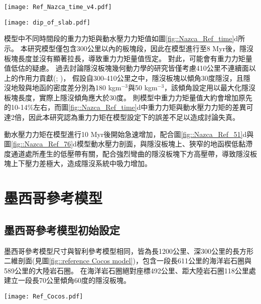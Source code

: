 \begin{figure*}[ht!]
    \centering
    \texttt{[image: Ref\_Nazca\_time\_v4.pdf]}
    \caption[智利參考模型隱沒板塊狀態隨時間變化]{智利參考模型隱沒板塊狀態隨時間變化，灰色底標出平坦隱沒發育後時間段。(a)參考模型平坦長度隨時間變化。(b)參考模型平坦深度隨時間變化，灰虛線為\citealp{Manea2017}中提及之智利平坦隱沒平坦深度約落在100公里深。(c)參考模型隱沒板塊自海溝到深度150公里之傾角，傾角值有做1 Myr的移動平均。(d)參考模型中重力力矩與動水壓力力矩隨時間變化。其中粉紅色線為重力力矩，深藍色線為動水壓力力矩。兩者皆有做1 Myr的移動平均。}
    \label{fig::Nazca_Ref_time}
\end{figure*}

\begin{figure*}[h]
    \centering
    \texttt{[image: dip\_of\_slab.pdf]}
    \caption[本研究中隱沒傾角的計算方式]{本研究中隱沒傾角的計算方式。}
    \label{fig::dip_of_slab}
\end{figure*}

模型中不同時間段的重力力矩與動水壓力力矩值如圖\ref{fig::Nazca_Ref_time}d所示。
本研究模型僅包含300公里以內的板塊段，因此在模型進行至8 Myr後，隱沒板塊長度並沒有顯著拉長，導致重力力矩量值恆定。
對此，可能會有重力力矩量值低估的疑慮。
過去討論隱沒板塊幾何動力學的研究皆僅考慮410公里不連續面以上的作用力貢獻(\citealp{schellart2004quantifying}; \citealp{billen2008modeling})，
假設自300-410公里之中，隱沒板塊以傾角30度隱沒，且隱沒地殼與地函的密度差分別為180 kgm$^{-3}$與50 kgm$^{-3}$，該傾角設定用以最大化隱沒板塊長度，實際上隱沒傾角應大於30度。
則模型中重力力矩量值大約會增加原先的10-14$\%$左右，而圖\ref{fig::Nazca_Ref_time}d中重力力矩與動水壓力力矩的差異可達2倍，因此本研究認為重力力矩在模型設定下的誤差不足以造成討論失真。

動水壓力力矩在模型進行10 Myr後開始急速增加，配合圖\ref{fig::Nazca_Ref_51}d與圖\ref{fig::Nazca_Ref_76}d模型動水壓力剖面，與隱沒板塊上、狹窄的地函楔低黏滯度通道處所產生的低壓帶有關，配合強烈彎曲的隱沒板塊下方高壓帶，導致隱沒板塊上下壓力差極大，造成隱沒系統中吸力增加。

\newpage
\section{墨西哥參考模型}
\subsection{墨西哥參考模型初始設定}
墨西哥參考模型尺寸與智利參考模型相同，皆為長1200公里、深300公里的長方形二維剖面(見圖\ref{fig::reference Cocos model})，包含一段長611公里的海洋岩石圈與589公里的大陸岩石圈。
在海洋岩石圈絕對座標492公里、距大陸岩石圈118公里處建立一段長70公里傾角60度的隱沒板塊。
\begin{figure*}[ht!]
    \centering
    \texttt{[image: Ref\_Cocos.pdf]}
    \caption[墨西哥參考模型設計與邊界條件示意圖]{墨西哥參考模型設計與邊界條件示意圖}
    \label{fig::reference Cocos model}
\end{figure*}

